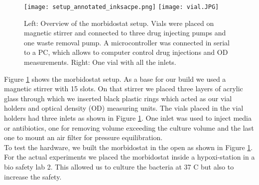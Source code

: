 \begin{figure}
	\texttt{[image: setup\_annotated\_inksacpe.png]}
	\texttt{[image: vial.JPG]}
	\caption{Left: Overview of the morbidostat setup. Vials were placed on magnetic stirrer and connected to three drug injecting pumps and one waste removal pump. A microcontroller was connected in serial to a PC, which allows to computer control drug injections and OD measurements. Right: One vial with all the inlets.}
	\label{figure:morbidostat_setup}
\end{figure}  
Figure \ref{figure:morbidostat_setup} shows the morbidostat setup.
As a base for our build we used a magnetic stirrer with 15 slots. On that stirrer we placed three layers of acrylic glass through which we inserted black plastic rings which acted as our vial holders and optical density (OD) measuring units. 
The vials placed in the vial holders had three inlets as shown in Figure \ref{figure:morbidostat_setup}. One inlet was used to inject media or antibiotics, one for removing volume exceeding the culture volume and the last one to mount an air filter for pressure equilibration. \\
To test the hardware, we built the morbidostat in the open as shown in Figure \ref{figure:morbidostat_setup}. For the actual experiments we placed the morbidostat inside a hypoxi-station in a bio safety lab 2. This allowed us to culture the bacteria at 37 \degree C but also to increase the safety. 


